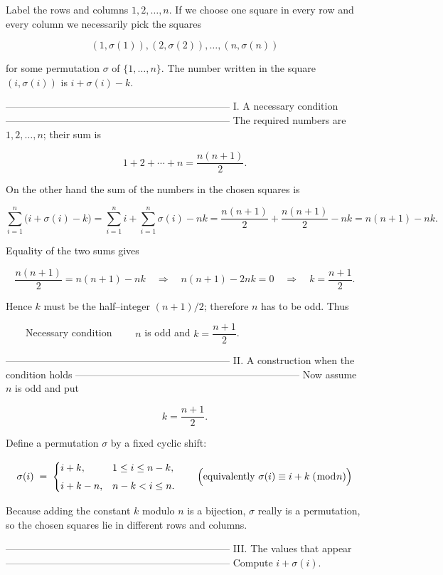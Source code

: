 Label the rows and columns \(1,2,\dots ,n\).
If we choose one square in every row and every column we
necessarily pick the squares  

\[
(1,\sigma(1)),(2,\sigma(2)),\dots ,(n,\sigma(n))
\]

for some permutation \(\sigma\) of \(\{1,\dots ,n\}\).
The number written in the square \((i,\sigma(i))\) is  
\(i+\sigma(i)-k\).

--------------------------------------------------------------------
I.  A necessary condition
--------------------------------------------------------------------
The required numbers are \(1,2,\dots ,n\); their sum is  

\[
1+2+\cdots +n=\frac{n(n+1)}2 .
\]

On the other hand the sum of the numbers in the chosen squares is  

\[
\sum_{i=1}^{n}\bigl(i+\sigma(i)-k\bigr)
      =\sum_{i=1}^{n}i+\sum_{i=1}^{n}\sigma(i)-nk
      =\frac{n(n+1)}2+\frac{n(n+1)}2-nk
      =n(n+1)-nk .
\]

Equality of the two sums gives  

\[
\frac{n(n+1)}2=n(n+1)-nk
\quad\Longrightarrow\quad
n(n+1)-2nk=0
\quad\Longrightarrow\quad
k=\frac{n+1}{2}.
\]

Hence \(k\) must be the half–integer \((n+1)/2\); therefore \(n\)
has to be odd.  Thus

  Necessary condition   \(n\) is odd and \(k=\dfrac{n+1}{2}\).

--------------------------------------------------------------------
II.  A construction when the condition holds
--------------------------------------------------------------------
Now assume \(n\) is odd and put  

\[
k=\frac{n+1}{2}.
\]

Define a permutation \(\sigma\) by a fixed cyclic shift:

\[
\sigma(i)\;=\;
\begin{cases}
i+k,& 1\le i\le n-k,\\[4pt]
i+k-n,& n-k< i\le n.
\end{cases}
\qquad\Bigl(\text{equivalently } \sigma(i)\equiv i+k\;(\bmod n)\Bigr)
\]

Because adding the constant \(k\) modulo \(n\) is a bijection,
\(\sigma\) really is a permutation, so the chosen squares lie in
different rows and columns.

--------------------------------------------------------------------
III.  The values that appear
--------------------------------------------------------------------
Compute \(i+\sigma(i)\).

